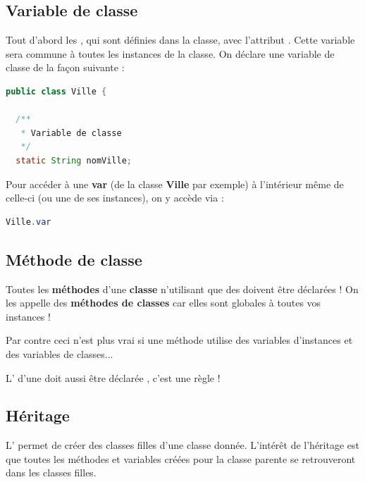 \documentclass[a4paper,twoside]{article}
\begin{document}
\subsection{Variable de classe}
Tout d'abord les , qui sont définies dans la classe, avec l'attribut . Cette variable sera commune à toutes les instances de la classe. On déclare une variable de classe de la façon suivante :
\begin{lstlisting}[language=java]
public class Ville {
 
  /**
   * Variable de classe
   */
  static String nomVille;
\end{lstlisting}

\bigskip

Pour accéder à une  \textbf{var} (de la classe \textbf{Ville} par exemple) à l'intérieur même de celle-ci (ou une de ses instances), on y accède via :
\begin{lstlisting}[language=java]
Ville.var
\end{lstlisting}

\subsection{Méthode de classe}\label{sec:methode_classe}
Toutes les \textbf{méthodes} d'une \textbf{classe} n'utilisant que des  doivent être déclarées  ! On les appelle des \textbf{méthodes de classes} car elles sont globales à toutes vos instances !

\begin{remarque}
Par contre ceci n'est plus vrai si une méthode utilise des variables d'instances et des variables de classes...
\end{remarque}

L' d'une  doit aussi être déclarée , c'est une règle !

\subsection{Héritage}\label{sec:heritage}
L' permet de créer des classes filles d'une classe donnée. L'intérêt de l'héritage est que toutes les méthodes et variables créées pour la classe parente se retrouveront dans les classes filles. 
\end{document}
